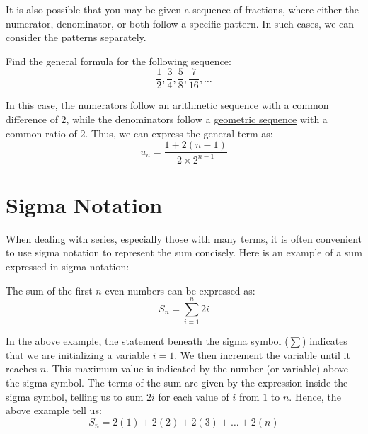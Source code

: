 It is also possible that you may be given a sequence of fractions, where either the numerator,
denominator, or both follow a specific pattern. In such cases, we can consider the patterns separately.

\begin{exercise}
  Find the general formula for the following sequence:
  \begin{equation*}
    \frac{1}{2}, \frac{3}{4}, \frac{5}{8}, \frac{7}{16}, \ldots
  \end{equation*}
\end{exercise}
\begin{answer}
  In this case, the numerators follow an \hyperref[def:arithmetic_sequence]{arithmetic sequence} with a common difference of $2$, 
  while the denominators follow a \hyperref[def:geometric_sequence]{geometric sequence} with a common ratio of $2$. 
  Thus, we can express the general term as:
  \begin{equation*}
    u_n = \frac{1 + 2(n-1)}{2\times 2^{n - 1}}
  \end{equation*}
\end{answer}

\section{Sigma Notation}\label{sec:sigma-notation}

When dealing with \hyperref[def:series]{series}, especially those with many terms, it 
is often convenient to use sigma notation to represent the sum concisely. Here is an example of 
a sum expressed in sigma notation:
\begin{eg}
  The sum of the first $n$ even numbers can be expressed as:
  \begin{equation*}
    S_n = \sum_{i=1}^{n} 2i
  \end{equation*}
\end{eg}
\begin{explanation}
  In the above example, the statement beneath the sigma symbol ($\sum$) indicates that we are initializing a variable $i=1$.
  We then increment the variable until it reaches $n$. This maximum value is indicated
  by the number (or variable) above the sigma symbol. The terms of the sum are given by the expression inside the sigma symbol,
  telling us to sum $2i$ for each value of $i$ from $1$ to $n$. Hence, the above example tell us:
  \begin{equation*}
    S_n = 2(1) + 2(2) + 2(3) + \ldots + 2(n)
  \end{equation*}
\end{explanation}

